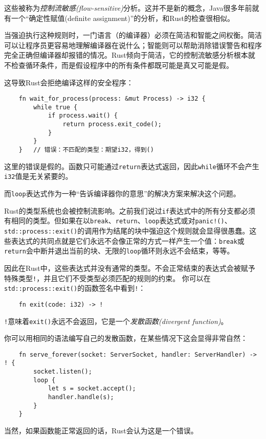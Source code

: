 这些被称为\emph{控制流敏感(flow-sensitive)}分析。这并不是新的概念，Java很多年前就有一个“确定性赋值(definite assignment)”的分析，和Rust的检查很相似。

当强迫执行这种规则时，一门语言（的编译器）必须在简洁和智能之间权衡。简洁可以让程序员更容易地理解编译器在说什么；智能则可以帮助消除错误警告和程序完全正确但编译器却报错的情况。Rust倾向于简洁，它的控制流敏感分析根本就不检查循环条件，而是假设程序中的所有条件都既可能是真又可能是假。

这导致Rust会拒绝编译这样的安全程序：
\begin{verbatim}
    fn wait_for_process(process: &mut Process) -> i32 {
        while true {
            if process.wait() {
                return process.exit_code();
            }
        }
    }   // 错误：不匹配的类型：期望i32，得到()
\end{verbatim}

这里的错误是假的。函数只可能通过\texttt{return}表达式返回，因此\texttt{while}循环不会产生\texttt{i32}值是无关紧要的。

而\texttt{loop}表达式作为一种“告诉编译器你的意思”的解决方案来解决这个问题。

Rust的类型系统也会被控制流影响。之前我们说过\texttt{if}表达式中的所有分支都必须有相同的类型。但如果在以\texttt{break}、\texttt{return}、\texttt{loop}表达式或对\texttt{panic!()}、\texttt{std::process::exit()}的调用作为结尾的块中强迫这个规则就会显得很愚蠢。这些表达式的共同点就是它们永远不会像正常的方式一样产生一个值：\texttt{break}或\texttt{return}会中断并退出当前的块、无限的\texttt{loop}循环则永远不会结束，等等。

因此在Rust中，这些表达式并没有通常的类型。不会正常结束的表达式会被赋予特殊类型\texttt{!}，并且它们不受类型必须匹配的规则的约束。 你可以在\texttt{std::process::exit()}的函数签名中看到\texttt{!}：
\begin{verbatim}
    fn exit(code: i32) -> !
\end{verbatim}

\texttt{!}意味着\texttt{exit()}永远不会返回，它是一个\emph{发散函数(divergent function)}。

你可以用相同的语法编写自己的发散函数，在某些情况下这会显得非常自然：
\begin{verbatim}
    fn serve_forever(socket: ServerSocket, handler: ServerHandler) -> ! {
        socket.listen();
        loop {
            let s = socket.accept();
            handler.handle(s);
        }
    }
\end{verbatim}

当然，如果函数能正常返回的话，Rust会认为这是一个错误。

